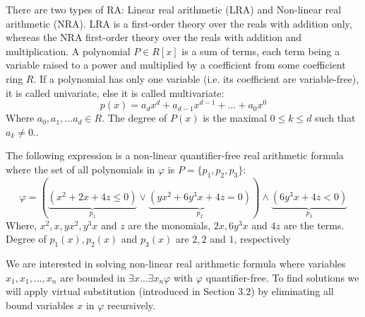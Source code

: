 There are two types of RA: Linear real arithmetic (LRA) and Non-linear real arithmetic (NRA). LRA is a first-order theory over the reals with addition only, whereas the NRA first-order theory over the reals with addition and multiplication.\newline
A polynomial $P\in R[x]$ is a sum of terms, each term being a variable raised to a power and multiplied by a coefficient from some coefficient ring $R$. If a polynomial has only one variable (i.e. its coefficient are variable-free), it is called univariate, else it is called multivariate: 
$$ p(x) = a_{d}x^{d} + a_{d-1}x^{d-1} + \ldots + a_{0}x^{0} $$
Where $a_{0}, a_{1},\ldots a_{d}\in R$.\newline
The degree of $P(x)$ is the maximal $0\leq k\leq d$ such that $a_{k}\neq 0$.\newline.
\begin{example}
	The following expression is a non-linear quantifier-free real arithmetic formula where the set of all polynomials in $\varphi$ is $P=\{p_{1}, p_{2}, p_{3}\}$:
	$$\varphi = (\underbrace{(x^{2}+2x+4z\leq 0)}\limits_{p_{1}}\vee \underbrace{(yx^{2}+6y^{3}x+4z= 0)}\limits_{p_{2}}) \wedge \underbrace{(6y^{3}x+4z< 0)}\limits_{p_{3}} $$
	Where, $x^{2}, x, yx^{2}, y^{3}x$ and $z$ are the monomials, $2x, 6y^{3}x$ and $4z$ are the terms. Degree of $p_{1}(x), p_{2}(x)$ and $p_{3}(x)$ are $2, 2$ and $1$, respectively
\end{example} 
We are interested in solving non-linear real arithmetic formula where variables $x_{1},x_{1},\ldots,x_{n}$ are bounded in $\exists x\ldots\exists x_{n}\varphi$ with $\varphi$ quantifier-free. To find solutions we will apply virtual substitution (introduced in Section $3.2$) by eliminating all bound variables $x$ in $\varphi$ recursively.
